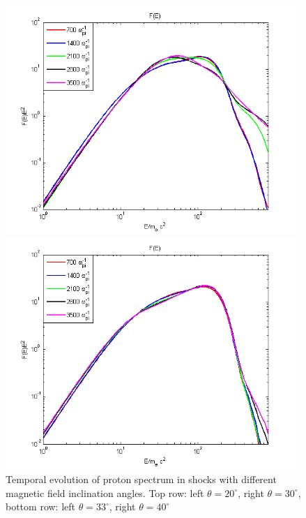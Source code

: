 \documentclass[a4paper]{jpconf}
\begin{document}
\begin{figure}[h!]
\begin{minipage}{0.48\textwidth}
		\includegraphics[width=0.98\textwidth]{fig/spectrump33.png} 
	\end{minipage}
	\begin{minipage}{0.48\textwidth}
		\centering
		\includegraphics[width=0.98\textwidth]{fig/spectrump40.png} 
	\end{minipage}
	\caption{Temporal evolution of proton spectrum in shocks with different magnetic field inclination angles. Top row: left $\theta = 20^\circ$, right $\theta = 30^\circ$, bottom row: left $\theta = 33^\circ$, right $\theta = 40^\circ$}
	\label{spectrump}
\end{figure}
	
\end{document}

